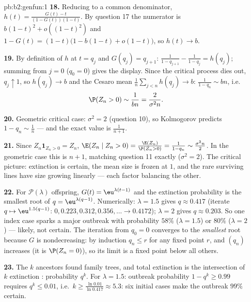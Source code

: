 \begin{solution}{pb:b2:genfun:1}
\textbf{18.} Reducing to a common denominator, $h(t) =
\frac{G(t) - t}{(1 - G(t))(1 - t)}$. By question 17 the
numerator is $b(1-t)^2 + o((1-t)^2)$ and $1 - G(t) = (1 -
t)\bigl(1 - b(1-t) + o(1-t)\bigr)$, so $h(t) \to b$.

\textbf{19.} By definition of $h$ at $t = q_j$ and $G(q_j) =
q_{j+1}$: $\frac1{1 - q_{j+1}} - \frac1{1-q_j} = h(q_j)$;
summing from $j = 0$ ($q_0 = 0$) gives the display. Since the
critical process dies out, $q_j \uparrow 1$, so $h(q_j) \to
b$ and the Cesaro mean $\frac1n\sum_{j<n}h(q_j) \to b$:
$\frac1{1-q_n} \sim bn$, i.e.
\[
\P(Z_n > 0) \sim \frac1{bn} = \frac{2}{\sigma^2 n} .
\]

\textbf{20.} Geometric critical case: $\sigma^2 = 2$
(question 10), so Kolmogorov predicts $1 - q_n \sim \frac1n$
--- and the exact value is $\frac1{n+1}$.

\textbf{21.} Since $Z_n\mathbf 1_{Z_n > 0} = Z_n$, $\E(Z_n
\mid Z_n > 0) = \frac{\E(Z_n)}{\P(Z_n > 0)} = \frac1{1 -
q_n} \sim \frac{\sigma^2n}2$. In the geometric case this is
$n + 1$, matching question 11 exactly ($\sigma^2 = 2$). The
critical picture: extinction is certain, the mean size is
frozen at $1$, and the rare surviving lines have size growing
linearly --- each factor balancing the other.

\textbf{22.} For $\mathcal P(\lambda)$ offspring, $G(t) =
\eu^{\lambda(t-1)}$ and the extinction probability is the
smallest root of $q = \eu^{\lambda(q-1)}$. Numerically:
$\lambda = 1.5$ gives $q \approx 0.417$ (iterate $q \mapsto
\eu^{1.5(q-1)}$: $0, 0.223, 0.312, 0.356, \dots \to 0.4172$);
$\lambda = 2$ gives $q \approx 0.203$. So one index case
sparks a major outbreak with probability $58\%$
($\lambda = 1.5$) or $80\%$ ($\lambda = 2$) --- likely, not
certain. The iteration from $q_0 = 0$ converges to the
\emph{smallest} root because $G$ is nondecreasing: by
induction $q_n \leq r$ for any fixed point $r$, and $(q_n)$
increases (it is $\P(Z_n = 0)$), so its limit is a fixed
point below all others.

\textbf{23.} The $k$ ancestors found  family
trees, and total extinction is the intersection of $k$
 extinction : probability $q^k$. For
$\lambda = 1.5$: outbreak probability $1 - q^k \geq 0.99$
requires $q^k \leq 0.01$, i.e.\ $k \geq
\frac{\ln 0.01}{\ln 0.417} \approx 5.3$: six initial cases
make the outbreak $99\%$ certain.


\end{solution}
